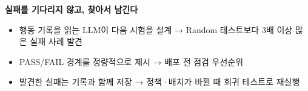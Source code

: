 \documentclass[aspectratio=169,11pt]{beamer}
\begin{document}
{
\begin{frame}
\vspace*{12mm}
{\fontsize{24}{30}\selectfont\bfseries 실패를 기다리지 않고, 찾아서 남긴다\par}
\vspace{8mm}
\begin{itemize}
\item 행동 기록을 읽는 LLM이 다음 시험을 설계 \;→\; Random 테스트보다 3배 이상 많은 실패 사례 발견
\item PASS/FAIL 경계를 정량적으로 제시 \;→\; 배포 전 점검 우선순위
\item 발견한 실패는 기록과 함께 저장 \;→\; 정책·배치가 바뀔 때 회귀 테스트로 재실행
\end{itemize}
\end{frame}}
\end{document}
